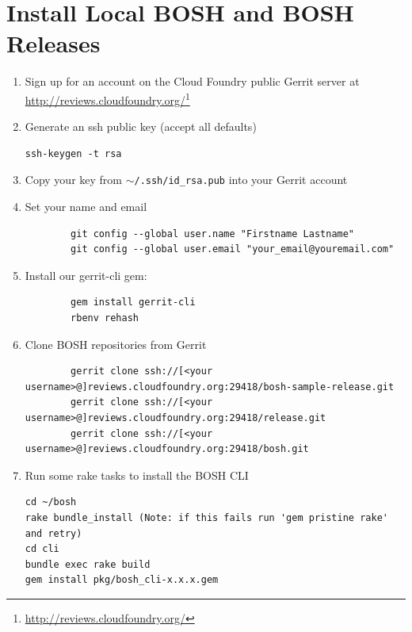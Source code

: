 \section{Install Local BOSH and BOSH Releases}
\label{installlocalboshandboshreleases}

\begin{enumerate}
\item Sign up for an account on the Cloud Foundry public Gerrit server at \href{http://reviews.cloudfoundry.org/}{http:/\slash reviews.cloudfoundry.org\slash }\footnote{\href{http://reviews.cloudfoundry.org/}{http:/\slash reviews.cloudfoundry.org\slash }}

\item Generate an ssh public key (accept all defaults)

\begin{verbatim}
ssh-keygen -t rsa
\end{verbatim}


\item Copy your key from \texttt{\ensuremath{\sim}\slash .ssh\slash id\_rsa.pub} into your Gerrit account

\item Set your name and email

\begin{verbatim}
        git config --global user.name "Firstname Lastname"
        git config --global user.email "your_email@youremail.com"
\end{verbatim}


\item Install our gerrit-cli gem:

\begin{verbatim}
        gem install gerrit-cli
        rbenv rehash
\end{verbatim}


\item Clone BOSH repositories from Gerrit

\begin{verbatim}
        gerrit clone ssh://[<your username>@]reviews.cloudfoundry.org:29418/bosh-sample-release.git
        gerrit clone ssh://[<your username>@]reviews.cloudfoundry.org:29418/release.git
        gerrit clone ssh://[<your username>@]reviews.cloudfoundry.org:29418/bosh.git
\end{verbatim}


\item Run some rake tasks to install the BOSH CLI

\begin{verbatim}
cd ~/bosh
rake bundle_install (Note: if this fails run 'gem pristine rake' and retry)
cd cli
bundle exec rake build
gem install pkg/bosh_cli-x.x.x.gem
\end{verbatim}


\end{enumerate}

